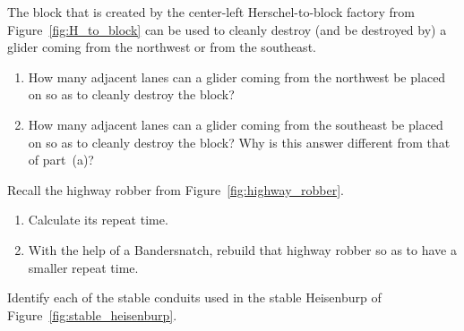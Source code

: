 \begin{multicols}{2}
	
	\mfilbreak
	
	
	\begin{problem}\label{exer:block_factory_block_gliders} 
		The block that is created by the center-left Herschel-to-block factory from Figure~\ref{fig:H_to_block} can be used to cleanly destroy (and be destroyed by) a glider coming from the northwest or from the southeast.
		
		\begin{enumerate}[label=\bf\color{ocre}(\alph*)]
			\item How many adjacent lanes can a glider coming from the northwest be placed on so as to cleanly destroy the block?
			
			\item How many adjacent lanes can a glider coming from the southeast be placed on so as to cleanly destroy the block? Why is this answer different from that of part~(a)?
		\end{enumerate}
	\end{problem}
	
	
	\mfilbreak
	
	
	\begin{problem}\label{exer:better_highway_robber_bandersnatch}
		Recall the highway robber from Figure~\ref{fig:highway_robber}.\smallskip
		
		\begin{enumerate}[label=\bf\color{ocre}(\alph*)]
			\item {} Calculate its repeat time.
			
			\item {} With the help of a Bandersnatch, rebuild that highway robber so as to have a smaller repeat time.
		\end{enumerate}
	\end{problem}


	\mfilbreak
	
	
	\begin{problemstar}\label{exer:stable_heisenburp_break_apart} 
		Identify each of the stable conduits used in the stable Heisenburp of Figure~\ref{fig:stable_heisenburp}.
		
	\end{problemstar}



\end{multicols}
